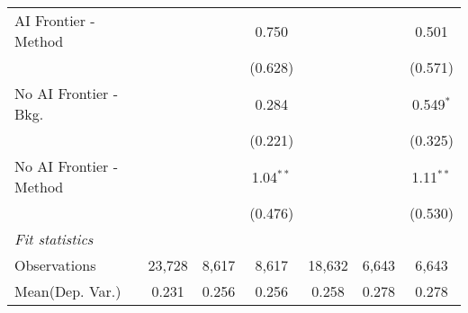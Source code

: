 \begin{tabular}{lcccccc}
   AI Frontier - Method    &               &              & 0.750       &              &             & 0.501\\   
                           &               &              & (0.628)     &              &             & (0.571)\\   
   No AI Frontier - Bkg.   &               &              & 0.284       &              &             & 0.549$^{*}$\\   
                           &               &              & (0.221)     &              &             & (0.325)\\   
   No AI Frontier - Method &               &              & 1.04$^{**}$ &              &             & 1.11$^{**}$\\   
                           &               &              & (0.476)     &              &             & (0.530)\\   
   \midrule
   \emph{Fit statistics}\\
   Observations            & 23,728        & 8,617        & 8,617       & 18,632       & 6,643       & 6,643\\  
Mean(Dep. Var.) & 0.231 & 0.256 & 0.256 & 0.258 & 0.278 & 0.278 \\
   

\end{tabular}
